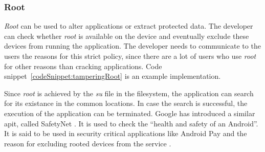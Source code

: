 \subsubsection{Root} \label{subsection:counter-improve-tampering-root}
\textit{Root} can be used to alter applications or extract protected data.
The developer can check whether \textit{root} is available on the device and eventually exclude these devices from running the application.
The developer needs to communicate to the users the reasons for this strict policy, since there are a lot of users who use \textit{root} for other reasons than cracking applications.
Code snippet~\ref{codeSnippet:tamperingRoot} is an example implementation.
\newline

Since \textit{root} is achieved by the \textit{su} file in the filesystem, the application can search for its existance in the common locations.
In case the search is successful, the execution of the application can be terminated.
\newline
Google has introduced a similar \gls{api}t, called SafetyNet \cite{safetynetGoogle}.
It is used to check the “health and safety of an Android”\cite{safetynetDev}.
It is said to be used in security critical applications like Android Pay and the reason for excluding rooted devices from the service \cite{safetynetGoogle} \cite{safetynetPay} \cite{safetynetPayx}.
